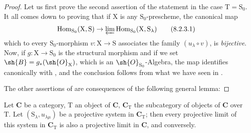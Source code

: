 \begin{proof}
Let us first prove the second assertion of the statement in the case $\mathrm{T}=\mathrm{S}_0$.
It all comes down to proving that if $\mathrm{X}$ is any $\mathrm{S}_0$-prescheme, the canonical map
\begin{equation}
  \operatorname{Hom}_{\mathrm{S}_0}(\mathrm{X},\mathrm{S})\to\varprojlim\operatorname{Hom}_{\mathrm{S}_0}(\mathrm{X},\mathrm{S}_\lambda)
  \tag{8.2.3.1}
\label{IV.8.2.3.1}
\end{equation}
which to every $\mathrm{S}_0$-morphism $v:\mathrm{X}\to\mathrm{S}$ associates the family $(u_\lambda\circ v)$, is \emph{bijective}.
Now, if $g:\mathrm{X}\to\mathrm{S}_0$ is the structural morphism and if we set $\sh{B}=g_*(\sh{O}_\mathrm{X})$, which is an $\sh{O}_{\mathrm{S}_0}$-Algebra, the map  identifies canonically with  , and the conclusion follows from what we have seen in .

The other assertions of  are consequences of the following general lemma:
\end{proof}

\begin{lemma}[8.2.4]
\label{IV.8.2.4}
Let $\mathbf{C}$ be a category, $\mathrm{T}$ an object of $\mathbf{C}$, $\mathbf{C}_\mathrm{T}$ the subcategory of objects of $\mathbf{C}$ over $\mathrm{T}$.
Let $(\mathrm{S}_\lambda,u_{\lambda\mu})$ be a projective system in $\mathbf{C}_\mathrm{T}$; then every projective limit of this system in $\mathbf{C}_\mathrm{T}$ is also a projective limit in $\mathbf{C}$, and conversely.
\end{lemma}

